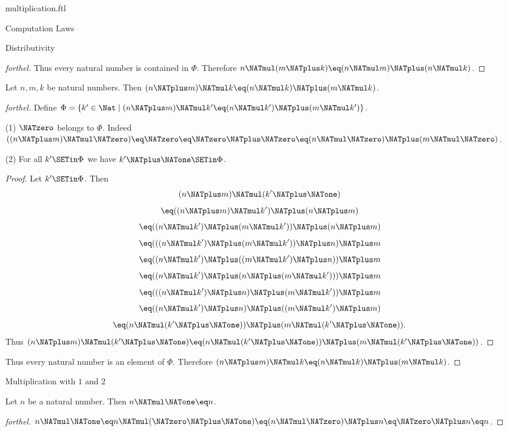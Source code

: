 \documentclass{naproche-library}
\begin{document}
\begin{smodule}[title=Multiplication]{multiplication.ftl}
\begin{sfragment}{Computation Laws}
\begin{sfragment}{Distributivity}
\begin{proof}[forthel]
      Thus every natural number is contained in $\Phi$.
      Therefore $n \NATmul (m \NATplus k) \eq (n \NATmul m) \NATplus (n \NATmul k)$.
    \end{proof}

    \begin{proposition}[forthel,id=ARITHMETIC_06_5742967566368768]
      Let $n, m, k$ be natural numbers.
      Then $(n \NATplus m) \NATmul k \eq (n \NATmul k) \NATplus (m \NATmul k)$.
    \end{proposition}
    \begin{proof}[forthel]
      Define $\Phi = \{ k' \in \Nat \mid (n \NATplus m) \NATmul k' \eq (n \NATmul k') \NATplus (m \NATmul k') \}$.

      (1) $\NATzero$ belongs to $\Phi$.
      Indeed $((n \NATplus m) \NATmul \NATzero)
        \eq \NATzero
        \eq \NATzero \NATplus \NATzero
        \eq (n \NATmul \NATzero) \NATplus (m \NATmul \NATzero)$.

      (2) For all $k' \SETin \Phi$ we have $k' \NATplus \NATone \SETin \Phi$.
      \begin{proof}
        Let $k' \SETin \Phi$.
        Then
        \[  (n \NATplus m) \NATmul (k' \NATplus \NATone)                        \]
        \[    \eq ((n \NATplus m) \NATmul k') \NATplus (n \NATplus m)              \]
        \[    \eq ((n \NATmul k') \NATplus (m \NATmul k')) \NATplus (n \NATplus m)   \]
        \[    \eq (((n \NATmul k') \NATplus (m \NATmul k')) \NATplus n) \NATplus m   \]
        \[    \eq ((n \NATmul k') \NATplus ((m \NATmul k') \NATplus n)) \NATplus m   \]
        \[    \eq ((n \NATmul k') \NATplus (n \NATplus (m \NATmul k'))) \NATplus m   \]
        \[    \eq (((n \NATmul k') \NATplus n) \NATplus (m \NATmul k')) \NATplus m   \]
        \[    \eq ((n \NATmul k') \NATplus n) \NATplus ((m \NATmul k') \NATplus m)   \]
        \[    \eq (n \NATmul (k' \NATplus \NATone)) \NATplus (m \NATmul (k' \NATplus \NATone)).  \]
        Thus $(n \NATplus m) \NATmul (k' \NATplus \NATone) \eq (n \NATmul (k' \NATplus \NATone)) \NATplus (m \NATmul (k' \NATplus \NATone))$.
      \end{proof}

      Thus every natural number is an element of $\Phi$.
      Therefore $(n \NATplus m) \NATmul k \eq (n \NATmul k) \NATplus (m \NATmul k)$.
    \end{proof}
  \end{sfragment}

  \begin{sfragment}{Multiplication with $1$ and $2$}
    \begin{proposition}[forthel,id=ARITHMETIC_06_2910559821365248]
      Let $n$ be a natural number.
      Then $n \NATmul \NATone \eq n$.
    \end{proposition}
    \begin{proof}[forthel]
      $n \NATmul \NATone
        \eq n \NATmul (\NATzero \NATplus \NATone)
        \eq (n \NATmul \NATzero) \NATplus n
        \eq \NATzero \NATplus n
        \eq n$.
    \end{proof}


\end{sfragment}
\end{sfragment}
\end{smodule}
\end{document}
